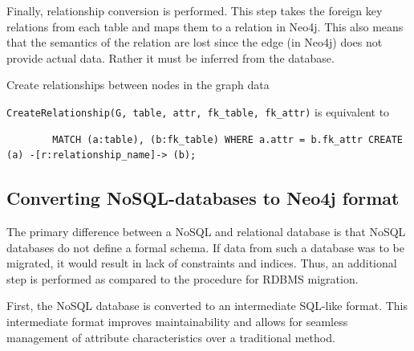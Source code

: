 \documentclass[12pt]{article}
\begin{document}
    Finally, relationship conversion is performed. This step takes the foreign key relations from each table and maps them to a relation in Neo4j. This also means that the semantics of the relation are lost since the edge (in Neo4j) does not provide actual data. Rather it must be inferred from the database.

    \begin{algorithm}[htb!]
        \SetAlgoLined
        \caption{Create relationships between nodes in the graph data}
        \label{algo:sql2rel}
    \end{algorithm}

    \verb|CreateRelationship(G, table, attr, fk_table, fk_attr)| is equivalent to 
    \begin{lstlisting}
        MATCH (a:table), (b:fk_table) WHERE a.attr = b.fk_attr CREATE (a) -[r:relationship_name]-> (b);
    \end{lstlisting}

    \subsection{Converting NoSQL-databases to Neo4j format}
    The primary difference between a NoSQL and relational database is that NoSQL databases do not define a formal schema. If data from such a database was to be migrated, it would result in lack of constraints and indices. Thus, an additional step is performed as compared to the procedure for RDBMS migration.

    First, the NoSQL database is converted to an intermediate SQL-like format. This intermediate format improves maintainability and allows for seamless management of attribute characteristics over a traditional method.
\end{document}
